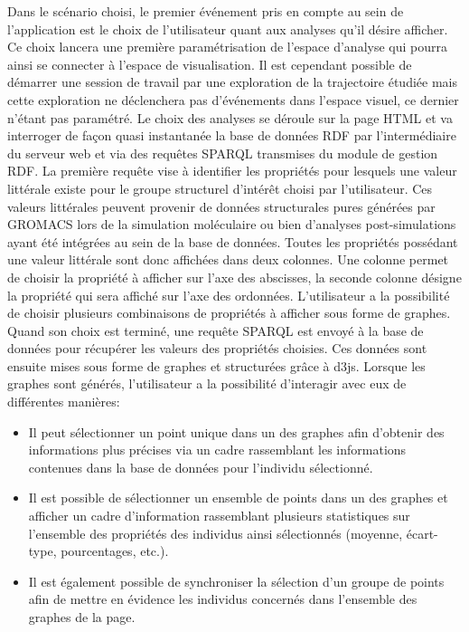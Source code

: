 Dans le scénario choisi, le premier événement pris en compte au sein de l'application est le choix de l'utilisateur quant aux analyses qu'il désire afficher. Ce choix lancera une première paramétrisation de l'espace d'analyse qui pourra ainsi se connecter à l'espace de visualisation. 
Il est cependant possible de démarrer une session de travail par une exploration de la trajectoire étudiée mais cette exploration ne déclenchera pas d'événements dans l'espace visuel, ce dernier n'étant pas paramétré.
Le choix des analyses se déroule sur la page HTML et va interroger de façon quasi instantanée la base de données RDF par l'intermédiaire du serveur web et via des requêtes SPARQL transmises du module de gestion RDF. La première requête vise à identifier les propriétés pour lesquels une valeur littérale existe pour le groupe structurel d'intérêt choisi par l'utilisateur. Ces valeurs littérales peuvent provenir de données structurales pures générées par GROMACS lors de la simulation moléculaire ou bien d'analyses post-simulations ayant été intégrées au sein de la base de données. Toutes les propriétés possédant une valeur littérale sont donc affichées dans deux colonnes. Une colonne permet de choisir la propriété à afficher sur l'axe des abscisses, la seconde colonne désigne la propriété qui sera affiché sur l'axe des ordonnées. L'utilisateur a la possibilité de choisir plusieurs combinaisons de propriétés à afficher sous forme de graphes. Quand son choix est terminé, une requête SPARQL est envoyé à la base de données pour récupérer les valeurs des propriétés choisies. Ces données sont ensuite mises sous forme de graphes et structurées grâce à d3js.
Lorsque les graphes sont générés, l'utilisateur a la possibilité d'interagir avec eux de différentes manières: 
\begin{itemize}
  \item Il peut sélectionner un point unique dans un des graphes afin d'obtenir des informations plus précises via un cadre rassemblant les informations contenues dans la base de données pour l'individu sélectionné.
  \item Il est possible de sélectionner un ensemble de points dans un des graphes et afficher un cadre d'information rassemblant plusieurs statistiques sur l'ensemble des propriétés des individus ainsi sélectionnés (moyenne, écart-type, pourcentages, etc.).
  \item Il est également possible de synchroniser la sélection d'un groupe de points afin de mettre en évidence les individus concernés dans l'ensemble des graphes de la page.
\end{itemize}


